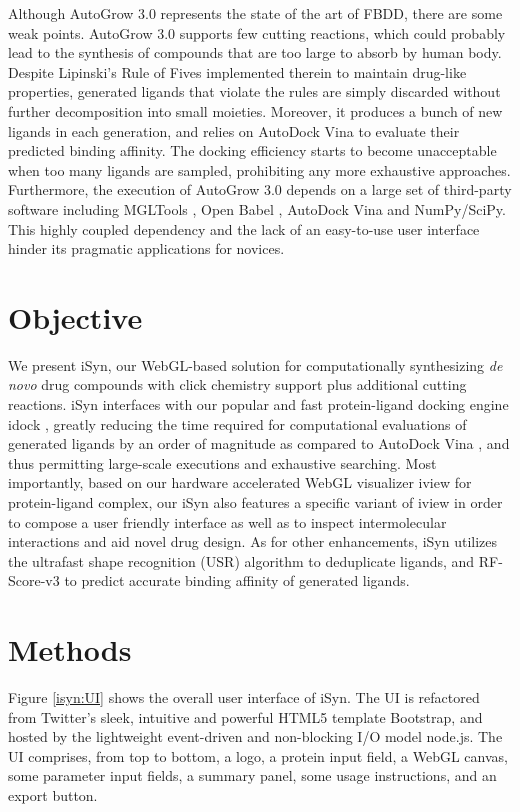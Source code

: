 Although AutoGrow 3.0 represents the state of the art of FBDD, there are some weak points. AutoGrow 3.0 supports few cutting reactions, which could probably lead to the synthesis of compounds that are too large to absorb by human body. Despite Lipinski's Rule of Fives \citep{169} implemented therein to maintain drug-like properties, generated ligands that violate the rules are simply discarded without further decomposition into small moieties. Moreover, it produces a bunch of new ligands in each generation, and relies on AutoDock Vina \citep{595} to evaluate their predicted binding affinity. The docking efficiency starts to become unacceptable when too many ligands are sampled, prohibiting any more exhaustive approaches. Furthermore, the execution of AutoGrow 3.0 depends on a large set of third-party software including MGLTools \citep{596}, Open Babel \citep{968}, AutoDock Vina \citep{595} and NumPy/SciPy. This highly coupled dependency and the lack of an easy-to-use user interface hinder its pragmatic applications for novices.

\section{Objective}

We present iSyn, our WebGL-based solution for computationally synthesizing \textit{de novo} drug compounds with click chemistry support plus additional cutting reactions. iSyn interfaces with our popular and fast protein-ligand docking engine idock \citep{1153}, greatly reducing the time required for computational evaluations of generated ligands by an order of magnitude \citep{1362} as compared to AutoDock Vina \citep{595}, and thus permitting large-scale executions and exhaustive searching. Most importantly, based on our hardware accelerated WebGL visualizer iview \citep{1366} for protein-ligand complex, our iSyn also features a specific variant of iview in order to compose a user friendly interface as well as to inspect intermolecular interactions and aid novel drug design. As for other enhancements, iSyn utilizes the ultrafast shape recognition (USR) algorithm \citep{1379} to deduplicate ligands, and RF-Score-v3 \citep{1647,1433} to predict accurate binding affinity of generated ligands.

\section{Methods}

Figure \ref{isyn:UI} shows the overall user interface of iSyn. The UI is refactored from Twitter's sleek, intuitive and powerful HTML5 template Bootstrap, and hosted by the lightweight event-driven and non-blocking I/O model node.js. The UI comprises, from top to bottom, a logo, a protein input field, a WebGL canvas, some parameter input fields, a summary panel, some usage instructions, and an export button.

